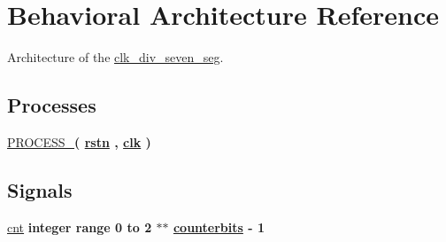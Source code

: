 \hypertarget{classclk__div__seven__seg_1_1Behavioral}{\section{Behavioral Architecture Reference}
\label{classclk__div__seven__seg_1_1Behavioral}
}


Architecture of the \hyperlink{classclk__div__seven__seg}{clk\-\_\-div\-\_\-seven\-\_\-seg}.  


\subsection*{Processes}
 \begin{DoxyCompactItemize}
\item 
\hypertarget{classclk__div__seven__seg_1_1Behavioral_afbf5b75c435428d734b3dd7d2f63b351}{\hyperlink{classclk__div__seven__seg_1_1Behavioral_afbf5b75c435428d734b3dd7d2f63b351}{P\-R\-O\-C\-E\-S\-S\-\_}{\bfseries  ( {\bfseries {\bfseries \hyperlink{classclk__div__seven__seg_aba021aec4b477b89079bb58ccadcc67e}{rstn}} \textcolor{vhdlchar}{ }\textcolor{vhdlchar}{ }\textcolor{vhdlchar}{ }} , {\bfseries {\bfseries \hyperlink{classclk__div__seven__seg_a8120037e0ee47c35ba2d79242209c72e}{clk}} \textcolor{vhdlchar}{ }} )}}\label{classclk__div__seven__seg_1_1Behavioral_afbf5b75c435428d734b3dd7d2f63b351}

\end{DoxyCompactItemize}
\subsection*{Signals}
 \begin{DoxyCompactItemize}
\item 
\hypertarget{classclk__div__seven__seg_1_1Behavioral_ac4dba71b323197d34acd6eeed07686d6}{\hyperlink{classclk__div__seven__seg_1_1Behavioral_ac4dba71b323197d34acd6eeed07686d6}{cnt} {\bfseries \textcolor{comment}{integer}\textcolor{vhdlchar}{ }\textcolor{vhdlkeyword}{range}\textcolor{vhdlchar}{ } \textcolor{vhdldigit}{0} \textcolor{vhdlchar}{ }\textcolor{vhdlchar}{ }\textcolor{vhdlchar}{ }\textcolor{vhdlkeyword}{to}\textcolor{vhdlchar}{ }\textcolor{vhdlchar}{ }\textcolor{vhdlchar}{ } \textcolor{vhdldigit}{2} \textcolor{vhdlchar}{ }\textcolor{vhdlchar}{$\ast$}\textcolor{vhdlchar}{$\ast$}\textcolor{vhdlchar}{ }{\bfseries \hyperlink{classclk__div__seven__seg_a8e97268cd0d50c552668e2c1d8719c2c}{counterbits}} \textcolor{vhdlchar}{ }\textcolor{vhdlchar}{-\/}\textcolor{vhdlchar}{ } \textcolor{vhdldigit}{1} \textcolor{vhdlchar}{ }} }\label{classclk__div__seven__seg_1_1Behavioral_ac4dba71b323197d34acd6eeed07686d6}

\end{DoxyCompactItemize}


